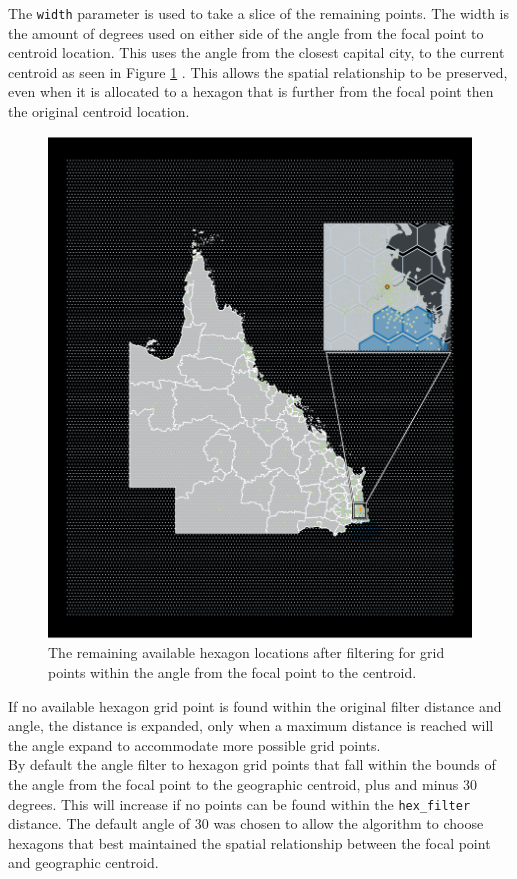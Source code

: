The \texttt{width} parameter is used to take a slice of the remaining
points. The width is the amount of degrees used on either side of the
angle from the focal point to centroid location. This uses the angle
from the closest capital city, to the current centroid as seen in Figure
\ref{fig:angles} . This allows the spatial relationship to be preserved,
even when it is allocated to a hexagon that is further from the focal
point then the original centroid location.

\begin{figure}[h]
\centering
\includegraphics[width=16cm]{figures/5allocate.pdf}
\caption{\label{fig:angles}The remaining available hexagon locations after filtering for grid points within the angle from the focal point to the centroid.}
\end{figure}

If no available hexagon grid point is found within the original filter
distance and angle, the distance is expanded, only when a maximum
distance is reached will the angle expand to accommodate more possible
grid points.\\
By default the angle filter to hexagon grid points that fall within the
bounds of the angle from the focal point to the geographic centroid,
plus and minus 30 degrees. This will increase if no points can be found
within the \texttt{hex\_filter} distance. The default angle of 30 was
chosen to allow the algorithm to choose hexagons that best maintained
the spatial relationship between the focal point and geographic
centroid.


